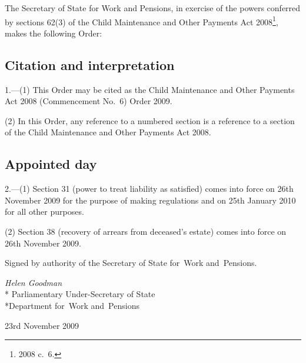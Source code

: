 \documentclass[12pt,a4paper]{article}
\title{\regstitle}
\author{S.I.\ 2009 No.\ 3072 (C.~134)}
\date{Made
23rd November 2009
}
\begin{document}
\maketitle

\noindent
The Secretary of State for Work and Pensions, in exercise of the powers conferred by sections 62(3) of the Child Maintenance and Other Payments Act 2008\footnote{2008 c.~6.}, makes the following Order: 

{\sloppy

\tableofcontents

}

\bigskip

\setcounter{secnumdepth}{-2}

\subsection[1. Citation and interpretation]{Citation and interpretation}

1.---(1)  This Order may be cited as the Child Maintenance and Other Payments Act 2008 (Commencement No.~6) Order 2009.

(2) In this Order, any reference to a numbered section is a reference to a section of the Child Maintenance and Other Payments Act 2008.

\subsection[2. Appointed day]{Appointed day}

2.---(1)  Section 31 (power to treat liability as satisfied) comes into force on 26th November 2009 for the purpose of making regulations and on 25th January 2010 for all other purposes.

(2) Section 38 (recovery of arrears from deceased’s estate) comes into force on 26th November 2009. 

\bigskip

\pagebreak[3]

Signed 
by authority of the 
Secretary of State for~Work and~Pensions.

{\raggedleft
\emph{Helen Goodman}\\*
Parliamentary Under-Secretary 
of State\\*Department 
for~Work and~Pensions

}

23rd November 2009

\small
\end{document}
